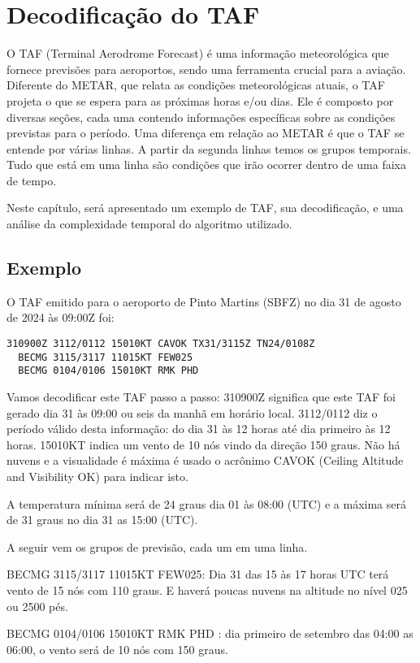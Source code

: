 \chapter{Decodificação do TAF}

O TAF (Terminal Aerodrome Forecast) é uma informação meteorológica que fornece
previsões para aeroportos, sendo uma ferramenta crucial para a aviação. Diferente
do METAR, que relata as condições meteorológicas atuais, o TAF projeta o que se
espera para as próximas horas e/ou dias. Ele é composto por diversas seções,
cada uma contendo informações específicas sobre as condições previstas para o
período. Uma diferença em relação ao METAR é que o TAF se entende por várias linhas.
A partir da segunda linhas temos os grupos temporais. Tudo que está em uma linha
são condições que irão ocorrer dentro de uma faixa de tempo. 

Neste capítulo, será apresentado um exemplo de TAF, sua decodificação,
e uma análise da complexidade temporal do algoritmo utilizado.

\section{Exemplo}
O TAF emitido para o aeroporto de Pinto Martins (SBFZ) no dia 31 de agosto 
de 2024 às 09:00Z foi:

\begin{verbatim}
310900Z 3112/0112 15010KT CAVOK TX31/3115Z TN24/0108Z 
  BECMG 3115/3117 11015KT FEW025 
  BECMG 0104/0106 15010KT RMK PHD
\end{verbatim}

Vamos decodificar este TAF passo a passo:
310900Z significa que este TAF foi gerado dia 31 às 09:00 ou seis da manhã em 
horário local. 3112/0112 diz o período válido desta informação: do dia 31 às 
12 horas até dia primeiro às 12 horas. 15010KT indica um vento de 10 nós vindo 
da direção 150 graus. Não há nuvens e a visualidade é máxima é usado o acrônimo 
CAVOK (Ceiling Altitude and Visibility OK) para indicar isto.

A temperatura mínima será de 24 graus dia 01 às 08:00 (UTC) e a máxima será 
de 31 graus no dia 31 as 15:00 (UTC).

A seguir vem os grupos de previsão, cada um em uma linha.

BECMG 3115/3117 11015KT FEW025: Dia 31 das 15 às 17 horas UTC terá vento de 
15 nós com 110 graus. E haverá poucas nuvens na altitude no nível 025 ou 2500 pés.

BECMG 0104/0106 15010KT RMK PHD : dia primeiro de setembro das 04:00 as 06:00, 
o vento será de 10 nós com 150 graus.

